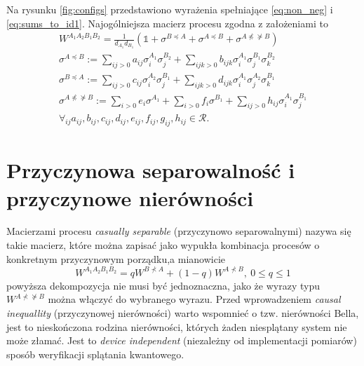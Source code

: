 \documentclass[10pt]{article} %
\newcommand{\WAll}{W^{A_1A_2B_1B_2}}
\begin{document}
Na rysunku \ref{fig:configs} przedstawiono wyrażenia spełniające \eqref{eq:non_neg} i \eqref{eq:sums_to_id1}. Najogólniejsza macierz procesu zgodna z założeniami to
\begin{gather}
\WAll = \frac{1}{d_{A_1}d_{B_1}}(\mathbb{1} +\sigma^{B \preceq A} + \sigma^{A \preceq B} + \sigma^{A \npreceq \nsucceq B}) \\
\sigma^{A \preceq B} := \sum_{ij>0} a_{ij} \sigma^{A_1}_i \sigma^{B_2}_j + \sum_{ijk>0} b_{ijk} \sigma^{A_1}_i \sigma^{B_1}_j \sigma^{B_2}_k \\
\sigma^{B \preceq A} := \sum_{ij>0} c_{ij} \sigma^{A_2}_i \sigma^{B_1}_j + \sum_{ijk>0} d_{ijk} \sigma^{A_1}_i \sigma^{A_2}_j \sigma^{B_1}_k \\
 \sigma^{A \npreceq \nsucceq B} := \sum_{i>0} e_i  \sigma^{A_1} + \sum_{i>0} f_i  \sigma^{B_1} + \sum_{ij>0} h_{ij} \sigma^{A_1}_i \sigma^{B_1}_j \\
 \forall_{ij} a_{ij}, b_{ij}, c_{ij}, d_{ij}, e_{ij}, f_{ij}, g_{ij}, h_{ij} \in \mathcal{R} \nonumber.
\end{gather}
\section{Przyczynowa separowalność i przyczynowe nierówności}
Macierzami procesu \textit{casually separable} (przyczynowo separowalnymi) nazywa się takie macierz, które można zapisać jako wypukła kombinacja procesów o konkretnym przyczynowym porządku,a mianowicie
\begin{equation}
\label{eq:sep}
\WAll = qW^{B \nprec A} + (1-q)W^{A \nprec B},~0 \leq q \leq 1
\end{equation}
powyższa dekompozycja nie musi być jednoznaczna, jako że wyrazy typu $W^{A \nprec \nsucceq B}$ można włączyć do wybranego wyrazu.
Przed wprowadzeniem \textit{causal inequallity} (przyczynowej nierówności) warto wspomnieć o tzw. nierówności Bella, jest to nieskończona rodzina nierówności, których żaden niesplątany system nie może złamać. Jest to \textit{device independent} (niezależny od implementacji pomiarów) sposób weryfikacji splątania kwantowego.
\end{document}
